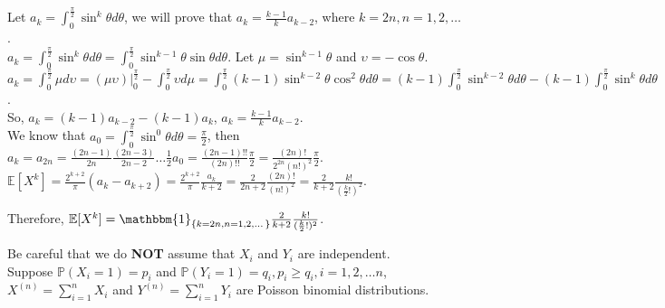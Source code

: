 \documentclass{homework}
\begin{document}
Let $a_{k}=\int_{0}^{\frac{\pi}{2}}\sin^{k}\theta d\theta$, we will prove that $a_{k}=\frac{k-1}{k}a_{k-2}$, where $k=2n, n=1,2,\dots$.\\
$a_{k}=\int_{0}^{\frac{\pi}{2}}\sin^{k}\theta d\theta = \int_{0}^{\frac{\pi}{2}}\sin^{k-1}\theta \sin \theta d\theta$.
Let $\mu=\sin^{k-1}\theta$ and $\upsilon=-\cos\theta$.\\
$a_{k}=\int_{0}^{\frac{\pi}{2}}\mu d\upsilon = (\mu \upsilon) \bigg|_{0}^{\frac{\pi}{2}}-\int_{0}^{\frac{\pi}{2}}\upsilon d\mu
=\int_{0}^{\frac{\pi}{2}}(k-1)\sin^{k-2}\theta\cos^2\theta d\theta 
= (k-1)\int_{0}^{\frac{\pi}{2}}\sin^{k-2}\theta d\theta - (k-1)\int_{0}^{\frac{\pi}{2}}\sin^{k}\theta d\theta$.\\
So, $a_{k} = (k-1)a_{k-2}-(k-1)a_{k}$, $a_{k}=\frac{k-1}{k}a_{k-2}$.\\
We know that $a_{0}=\int_{0}^{\frac{\pi}{2}}\sin^{0}\theta d\theta = \frac{\pi}{2}$, then
$a_{k}=a_{2n}=\frac{(2n-1)}{2n}\frac{(2n-3)}{2n-2}\dots \frac{1}{2}a_{0}=\frac{(2n-1)!!}{(2n)!!}\frac{\pi}{2}
=\frac{(2n)!}{2^{2n}(n!)^2}\frac{\pi}{2}$.\\
$\mathbb{E}[X^k]=\frac{2^{k+2}}{\pi}(a_{k}-a_{k+2})=\frac{2^{k+2}}{\pi}\frac{a_{k}}{k+2}
=\frac{2}{2n+2}\frac{(2n)!}{(n!)^2} = \frac{2}{k+2}\frac{k!}{(\frac{k}{2}!)^2}$.

Therefore, $\mathbb{E}[X^k] = \mathbbm{1}_{\{k=2n,n=1,2,\dots\}}\frac{2}{k+2}\frac{k!}{(\frac{k}{2}!)^2}$.

\question %
Be careful that we do \textbf{NOT} assume that $X_{i}$ and $Y_{i}$ are independent.\\
Suppose $\mathbb{P}(X_{i}=1)=p_{i}$ and $\mathbb{P}(Y_{i}=1)=q_{i}, p_{i} \geq q_{i}, i = 1,2,\dots n$, \\
$X^{(n)}=\sum_{i=1}^{n} X_{i}$ and $Y^{(n)}=\sum_{i=1}^{n} Y_{i}$ are Poisson binomial distributions.\\
\end{document}
